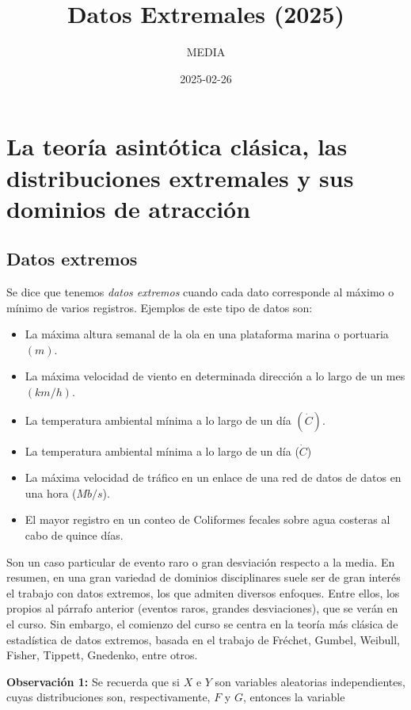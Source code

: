 \documentclass[
]{book}
\title{Datos Extremales (2025)}
\author{MEDIA}
\date{2025-02-26}
\providecommand{\tightlist}{%
  \setlength{\itemsep}{0pt}\setlength{\parskip}{0pt}}
\theoremstyle{definition}
\theoremstyle{definition}
\theoremstyle{definition}
\theoremstyle{definition}
\theoremstyle{remark}
\begin{document}
\maketitle

{
\setcounter{tocdepth}{1}
\tableofcontents
}
\chapter{La teoría asintótica clásica, las distribuciones extremales y sus dominios de atracción}\label{teo}

\section{Datos extremos}\label{datos-extremos}

Se dice que tenemos \emph{datos extremos} cuando cada
dato corresponde al máximo o mínimo de varios
registros. Ejemplos de este tipo de datos son:

\begin{itemize}
\tightlist
\item
  La máxima altura semanal de la ola en una
  plataforma marina o portuaria \((m)\).
\item
  La máxima velocidad de viento en determinada
  dirección a lo largo de un mes \((km/h)\).
\item
  La temperatura ambiental mínima a lo largo de
  un día \((\dot{C})\).
\item
  La temperatura ambiental mínima a lo largo de
  un día (\(\dot{C}\))
\item
  La máxima velocidad de tráfico en un enlace de
  una red de datos de datos en una hora (\(Mb/s\)).
\item
  El mayor registro en un conteo de Coliformes
  fecales sobre agua costeras al cabo de quince días.
\end{itemize}

Son un caso particular de evento raro o gran
desviación respecto a la media.
En resumen, en una gran variedad de dominios
disciplinares suele ser de gran interés el trabajo
con datos extremos, los que admiten diversos
enfoques. Entre ellos, los propios al párrafo
anterior (eventos raros, grandes desviaciones), que
se verán en el curso.
Sin embargo, el comienzo del curso se centra en la
teoría más clásica de estadística de datos extremos,
basada en el trabajo de Fréchet, Gumbel, Weibull,
Fisher, Tippett, Gnedenko, entre otros.

\textbf{Observación 1:} Se recuerda que si \(X\) e \(Y\) son variables aleatorias independientes, cuyas
distribuciones son, respectivamente, \(F\) y \(G\),
entonces la variable
\end{document}
